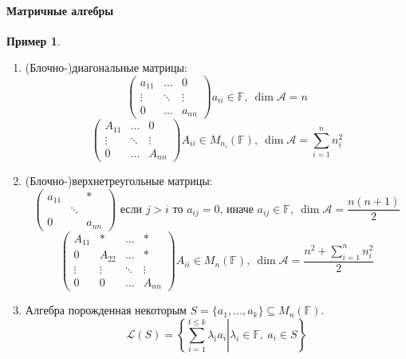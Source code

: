 \documentclass[a4paper, 14pt]{extarticle}
\theoremstyle{definition}
\newtheorem{example}{Пример}
\begin{document}
\paragraph{Матричные алгебры}

\begin{example}
	\leavevmode
	\begin{enumerate}
		\item (Блочно-)диагональные матрицы:
		\[\left(
			\begin{array}{ccc}
				a_{11}&\hdots&0\\
				\vdots&\ddots&\vdots\\
				0&\dots&a_{nn}
			\end{array}
		\right) a_{ii} \in \mathbb{F},\ \operatorname{dim} \mathcal{A} = n\]
		\[\left(
			\begin{array}{c|c|c}
				A_{11}&\hdots&0\\
				\hline
				\vdots&\ddots&\vdots\\
				\hline
				0&\dots&A_{nn}
			\end{array}
		\right) A_{ii} \in M_{n_i}(\mathbb{F}),\ \operatorname{dim} \mathcal{A} = \sum\limits_{i=1}^n n^2_i\]
		
		\item (Блочно-)верхнетреугольные матрицы:
		\[
			\left(
				\begin{array}{ccc}
					a_{11}&&*\\
					&\ddots&\\
					0&&a_{nn}
				\end{array}
			\right) \text{ если \(j > i\) то } a_{ij} = 0 \text{, иначе } a_{ij} \in \mathbb{F},\ \operatorname{dim} \mathcal{A} = \frac{n(n + 1)}{2}
		\]
		\[
			\left(
				\begin{array}{c|c|c|c}
					A_{11}&*&\hdots&*\\
					\hline
					0&A_{22}&\hdots&*\\
					\hline
					\vdots&\vdots&\ddots&\vdots\\
					\hline
					0&0&\hdots&A_{nn}
				\end{array}
			\right) A_{ii} \in M_n(\mathbb{F}),\ \operatorname{dim} \mathcal{A} = \frac{n^2 + \sum\limits_{i=1}^n n_i^2}{2}
		\]
		
		\item Алгебра порожденная некоторым \(S = \{a_1, \dots, a_k\} \subseteq M_n(\mathbb{F}).\)
		\[\left. \mathcal{L}(S) = \left\{ \sum\limits_{i=1}^{t \leqslant k} \lambda_i a_i \right| \lambda_i \in \mathbb{F},\ a_i \in S \right\}\]
	\end{enumerate}
\end{example}
\end{document}

